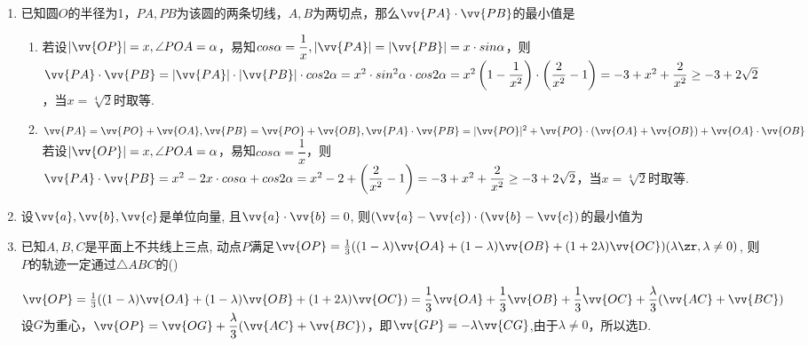 \begin{enumerate}
\item 已知圆$O$的半径为1，$PA, PB$为该圆的两条切线，$A, B$为两切点，那么$\vv{PA} \cdot \vv{PB}$的最小值是
\begin{jieda}
    \begin{enumerate}
        \item 若设$|\vv{OP}| = x, \angle POA = \alpha$，易知$cos\alpha = \dfrac{1}{x}, |\vv{PA}| = |\vv{PB}| = x \cdot sin\alpha$，则$\vv{PA} \cdot \vv{PB} = |\vv{PA}| \cdot |\vv{PB}| \cdot cos2\alpha = x^2 \cdot sin^2\alpha \cdot cos2\alpha = x^2\left(1-\dfrac{1}{x^2}\right) \cdot \left(\dfrac{2}{x^2} - 1\right) = -3 + x^2 + \dfrac{2}{x^2} \geq -3 + 2\sqrt{2}$，当$x = \sqrt[4]{2}$时取等.
        \item $\vv{PA} = \vv{PO} + \vv{OA}, \vv{PB} = \vv{PO} + \vv{OB}, \vv{PA} \cdot \vv{PB} = |\vv{PO}|^2 + \vv{PO} \cdot (\vv{OA} + \vv{OB}) + \vv{OA} \cdot \vv{OB}$ \\
        若设$|\vv{OP}| = x, \angle POA = \alpha$，易知$cos\alpha = \dfrac{1}{x}$，则$\vv{PA} \cdot \vv{PB} = x^2 - 2x\cdot cos\alpha + cos2\alpha = x^2 - 2 + \left(\dfrac{2}{x^2} - 1\right) = -3 + x^2 + \dfrac{2}{x^2} \geq -3 + 2\sqrt{2}$，当$x = \sqrt[4]{2}$时取等.
    \end{enumerate}
\end{jieda}

\item 设$\vv{a},\vv{b},\vv{c}$是单位向量, 且$\vv{a}\cdot\vv{b}=0$, 则$\left(\vv{a}-\vv{c}\right)\cdot\left(\vv{b}-\vv{c}\right)$的最小值为

\item 已知$A,B,C$是平面上不共线上三点, 动点$P$满足$\vv{OP}=\frac{1}{3}((1-\lambda)\vv{OA}+(1-\lambda)\vv{OB}+(1+2\lambda)\vv{OC})(\lambda\zr,\lambda\neq 0)$, 
则$P$的轨迹一定通过$\triangle{ABC}$的\dotfill()
\begin{jieda}
    $\vv{OP}=\frac{1}{3}((1-\lambda)\vv{OA}+(1-\lambda)\vv{OB}+(1+2\lambda)\vv{OC}) = \dfrac{1}{3}\vv{OA} + \dfrac{1}{3}\vv{OB} + \dfrac{1}{3} \vv{OC} + \dfrac{\lambda}{3}(\vv{AC} + \vv{BC})$\\
    设$G$为重心，$\vv{OP} = \vv{OG} + \dfrac{\lambda}{3}(\vv{AC} + \vv{BC})$，即$\vv{GP} = -\lambda \vv{CG}$,由于$\lambda \neq 0$，所以选D.
\end{jieda}


\end{enumerate}

